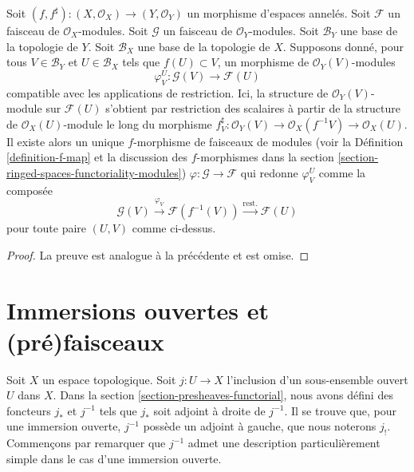\begin{lemma}
\label{lemma-f-map-basis-above-and-below-modules}
Soit $(f, f^\sharp) : (X, \mathcal{O}_X) \to (Y, \mathcal{O}_Y)$
un morphisme d'espaces annelés.
Soit $\mathcal{F}$ un faisceau de $\mathcal{O}_X$-modules.
Soit $\mathcal{G}$ un faisceau de $\mathcal{O}_Y$-modules.
Soit $\mathcal{B}_Y$ une base de la topologie de $Y$.
Soit $\mathcal{B}_X$ une base de la topologie de $X$.
Supposons donné, pour tous $V \in \mathcal{B}_Y$ et
$U \in \mathcal{B}_X$ tels que $f(U) \subset V$, un
morphisme de $\mathcal{O}_Y(V)$-modules
$$
\varphi_V^U :
\mathcal{G}(V)
\longrightarrow
\mathcal{F}(U)
$$
compatible avec les applications de restriction. Ici, la
structure de $\mathcal{O}_Y(V)$-module sur $\mathcal{F}(U)$
s'obtient par restriction des scalaires à partir de la structure de $\mathcal{O}_X(U)$-module
le long du morphisme $f^\sharp_V : \mathcal{O}_Y(V)
\to \mathcal{O}_X(f^{-1}V) \to \mathcal{O}_X(U)$.
Il existe alors un unique $f$-morphisme de faisceaux de modules (voir
la Définition \ref{definition-f-map} et la discussion
des $f$-morphismes dans la section \ref{section-ringed-spaces-functoriality-modules})
$\varphi : \mathcal{G} \to \mathcal{F}$
qui redonne $\varphi_V^U$ comme la composée
$$
\mathcal{G}(V) \xrightarrow{\varphi_V}
\mathcal{F}(f^{-1}(V)) \xrightarrow{\text{rest.}}
\mathcal{F}(U)
$$
pour toute paire $(U, V)$ comme ci-dessus.
\end{lemma}

\begin{proof}
La preuve est analogue à la précédente et est omise.
\end{proof}

\section{Immersions ouvertes et (pré)faisceaux}
\label{section-open-immersions}

\noindent
Soit $X$ un espace topologique.
Soit $j : U \to X$ l'inclusion d'un sous-ensemble ouvert $U$ dans $X$.
Dans la section \ref{section-presheaves-functorial}, nous avons défini
des foncteurs $j_*$ et $j^{-1}$ tels que $j_*$ soit adjoint à droite de
$j^{-1}$. Il se trouve que, pour une immersion ouverte, $j^{-1}$ possède
un adjoint à gauche, que nous noterons $j_!$. Commençons par remarquer que
$j^{-1}$ admet une description particulièrement simple dans le cas d'une
immersion ouverte.

